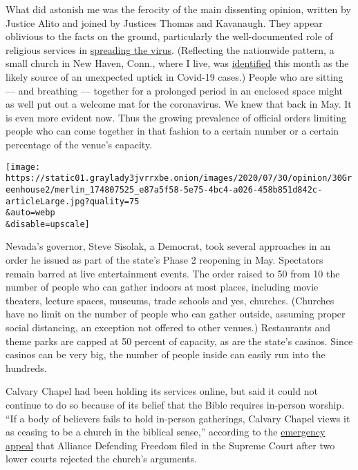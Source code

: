 What did astonish me was the ferocity of the main dissenting opinion,
written by Justice Alito and joined by Justices Thomas and Kavanaugh.
They appear oblivious to the facts on the ground, particularly the
well-documented role of religious services in
\href{https://www.nytimes3xbfgragh.onion/2020/07/08/us/coronavirus-churches-outbreaks.html?searchResultPosition=3}{spreading
the virus}. (Reflecting the nationwide pattern, a small church in New
Haven, Conn., where I live, was
\href{https://www.newhavenindependent.org/index.php/archives/entry/covid-struck_church_/}{identified}
this month as the likely source of an unexpected uptick in Covid-19
cases.) People who are sitting --- and breathing --- together for a
prolonged period in an enclosed space might as well put out a welcome
mat for the coronavirus. We knew that back in May. It is even more
evident now. Thus the growing prevalence of official orders limiting
people who can come together in that fashion to a certain number or a
certain percentage of the venue's capacity.

\texttt{[image: https://static01.graylady3jvrrxbe.onion/images/2020/07/30/opinion/30Greenhouse2/merlin\_174807525\_e87a5f58-5e75-4bc4-a026-458b851d842c-articleLarge.jpg?quality=75\\\&auto=webp\\\&disable=upscale]}

Nevada's governor, Steve Sisolak, a Democrat, took several approaches in
an order he issued as part of the state's Phase 2 reopening in May.
Spectators remain barred at live entertainment events. The order raised
to 50 from 10 the number of people who can gather indoors at most
places, including movie theaters, lecture spaces, museums, trade schools
and yes, churches. (Churches have no limit on the number of people who
can gather outside, assuming proper social distancing, an exception not
offered to other venues.) Restaurants and theme parks are capped at 50
percent of capacity, as are the state's casinos. Since casinos can be
very big, the number of people inside can easily run into the hundreds.

Calvary Chapel had been holding its services online, but said it could
not continue to do so because of its belief that the Bible requires
in-person worship. ``If a body of believers fails to hold in-person
gatherings, Calvary Chapel views it as ceasing to be a church in the
biblical sense,'' according to the
\href{https://www.supremecourt.gov/DocketPDF/19/19A1070/147153/20200707185749882_Calvary\%20Chapel\%20Emergency\%20Application\%20for\%20Injunction\%20with\%20Appendix\%20FINAL.pdf}{emergency
appeal} that Alliance Defending Freedom filed in the Supreme Court after
two lower courts rejected the church's arguments.

